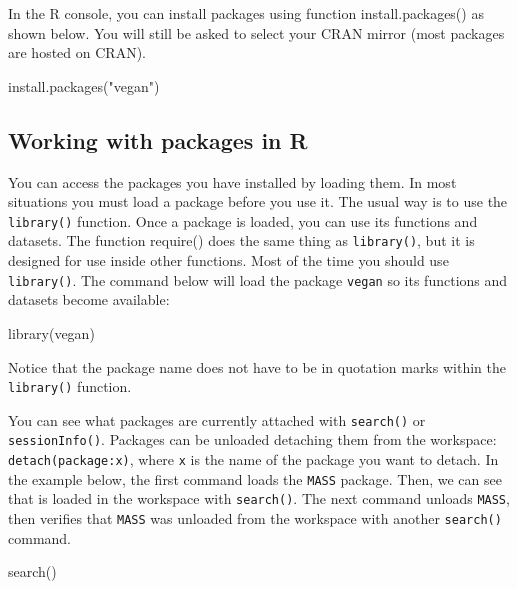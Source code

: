 \documentclass[
  13,
  letterpaper,
]{report}
\newenvironment{Shaded}{\begin{snugshade}}{\end{snugshade}}
\newcommand{\FunctionTok}[1]{\textcolor[rgb]{0.28,0.35,0.67}{#1}}
\newcommand{\NormalTok}[1]{\textcolor[rgb]{0.00,0.23,0.31}{#1}}
\newcommand{\StringTok}[1]{\textcolor[rgb]{0.13,0.47,0.30}{#1}}
\begin{document}
In the R console, you can install packages using function
install.packages() as shown below. You will still be asked to select
your CRAN mirror (most packages are hosted on CRAN).

\begin{Shaded}
\begin{Highlighting}[]
\FunctionTok{install.packages}\NormalTok{(}\StringTok{"vegan"}\NormalTok{)}
\end{Highlighting}
\end{Shaded}

\subsection{Working with packages in R}\label{sec-r-pack-work}

You can access the packages you have installed by loading them. In most
situations you must load a package before you use it. The usual way is
to use the \texttt{library()} function. Once a package is loaded, you
can use its functions and datasets. The function require() does the same
thing as \texttt{library()}, but it is designed for use inside other
functions. Most of the time you should use \texttt{library()}. The
command below will load the package \texttt{vegan} so its functions and
datasets become available:

\begin{Shaded}
\begin{Highlighting}[]
\FunctionTok{library}\NormalTok{(vegan)}
\end{Highlighting}
\end{Shaded}

Notice that the package name does not have to be in quotation marks
within the \texttt{library()} function.

You can see what packages are currently attached with \texttt{search()}
or \texttt{sessionInfo()}. Packages can be unloaded detaching them from
the workspace: \texttt{detach(package:x)}, where \texttt{x} is the name
of the package you want to detach. In the example below, the first
command loads the \texttt{MASS} package. Then, we can see that is loaded
in the workspace with \texttt{search()}. The next command unloads
\texttt{MASS}, then verifies that \texttt{MASS} was unloaded from the
workspace with another \texttt{search()} command.

\begin{Shaded}
\begin{Highlighting}[]
\FunctionTok{search}\NormalTok{()}
\end{Highlighting}
\end{Shaded}
\end{document}
